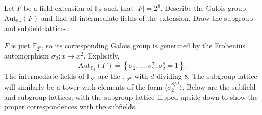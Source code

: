\documentclass[10pt]{report}
\begin{document}
\begin{exer}[]
Let $F$ be a field extension of $\mathbb{F}_{2}$ such that $|F| = 2^8$. Describe the Galois group $\text{Aut}_{\mathbb{F}_{2}}(F)$ and find all intermediate fields of the extension. Draw the subgroup and subfield lattices.
\end{exer}
$F$ is just $\mathbb{F}_{2^8}$, so its corresponding Galois group is generated by the Frobenius automorphism $\sigma_{2}: x \mapsto x^2$. Explicitly,
\[
\text{Aut}_{\mathbb{F}_{2}}(F) = \left\{ \sigma_2, \dots, \sigma_2^7, \sigma_{2}^8=1 \right\}.
\] The intermediate fields of $\mathbb{F}_{2^8}$ are the $\mathbb{F}_{2^d}$ with $d$ dividing $8$. The subgroup lattice will similarly be a tower with elements of the form $\langle \sigma_{2}^{8/d} \rangle$. Below are the subfield and subgroup lattices, with the subgroup lattice flipped upside down to show the proper correspondences with the subfields.

\begin{figure}[H]
	\centering
{}

\end{figure}
\end{document}

